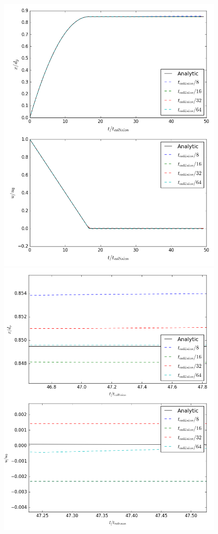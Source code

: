 \documentclass[a4paper,11pt,titlepage]{report}
\begin{document}
\begin{figure}[!htb]
\centering
\includegraphics[scale=0.45]{figures/python_verification/friction_verification.png}
\includegraphics[scale=0.45]{figures/python_verification/friction_verification_zoomed.png}

\end{figure}
\end{document}
